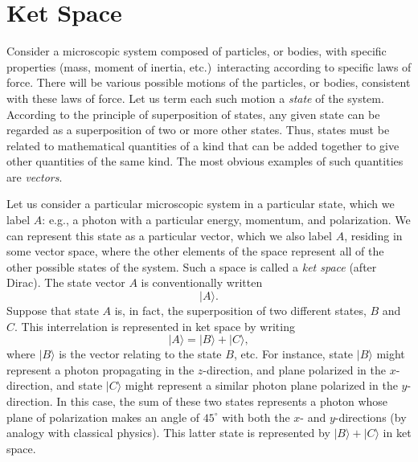 \section{Ket Space}
Consider a microscopic system composed of particles, or bodies, with
specific properties (mass, moment of inertia, {\rm etc.})\ interacting according
to specific laws of force. There will be various possible motions of the
particles, or bodies, consistent with these laws of force. Let us term each such
motion a {\em state}\/ of the system. According to the principle of superposition
of states, any given state can be regarded as a superposition of two or more other
states. Thus, states must be related to mathematical quantities of a kind that 
can be added together to give other quantities of the same kind. The most
obvious examples of such quantities are {\em vectors}. 

Let us consider a particular microscopic system in a particular state, which we
label $A$: {\rm e.g.}, a photon with a particular energy, momentum, and polarization.
We can represent this state as a particular vector, which we also
label $A$, residing in some vector space, where the other elements of the space
represent all of the other possible states of the system. Such a space
is called a {\em ket space}\/ (after Dirac). The state vector $A$ is
conventionally written
\begin{equation}
|A\rangle.
\end{equation}
Suppose that state $A$ is, in fact, the superposition of two different states,
$B$ and $C$. This interrelation is represented in ket space by writing 
\begin{equation}
|A\rangle = |B\rangle + |C\rangle,
\end{equation}
where $|B\rangle$ is the vector relating to the state $B$, {\rm etc}. For instance, state
$|B\rangle$ might represent a photon propagating
in the $z$-direction, and plane polarized in the $x$-direction, and state
$|C\rangle$ might represent a similar  photon plane polarized in the $y$-direction. 
In this case,
the sum of these two states represents a photon whose plane of polarization
makes an angle of $45^\circ$ with both the $x$- and $y$-directions (by analogy
with classical physics). This latter state is represented by $|B\rangle+|C\rangle$ in ket
space. 

